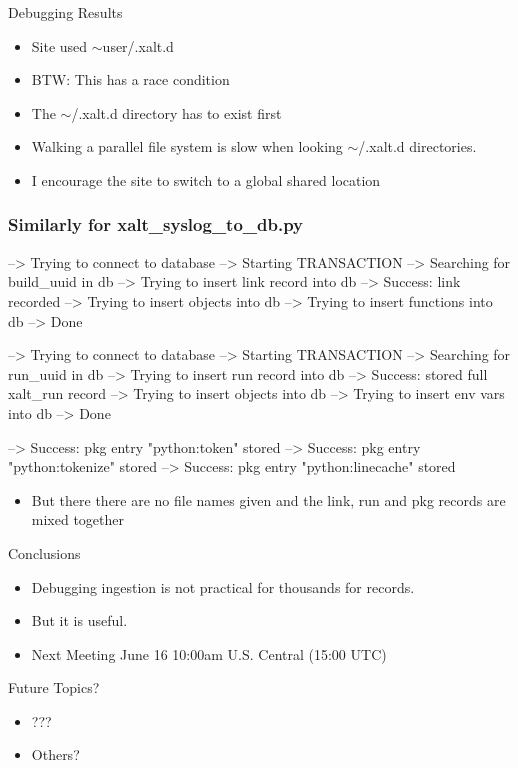 \documentclass{beamer}
\begin{document}
\begin{frame}{Debugging Results}
  \begin{itemize}
    \item Site used $\sim$user/.xalt.d
    \item BTW: This has a race condition 
    \item The $\sim$/.xalt.d directory has to exist first
    \item Walking a parallel file system is slow when looking
      $\sim$/.xalt.d directories.
    \item I encourage the site to switch to a global shared location
  \end{itemize}
\end{frame}

\begin{frame}[fragile]
    \frametitle{Similarly for xalt\_syslog\_to\_db.py}
 {\tiny
    \begin{semiverbatim}
  --> Trying to connect to database
  --> Starting TRANSACTION
  --> Searching for build_uuid in db
  --> Trying to insert link record into db
  --> Success: link recorded
  --> Trying to insert objects into db
  --> Trying to insert functions into db
  --> Done

  --> Trying to connect to database
  --> Starting TRANSACTION
  --> Searching for run_uuid in db
  --> Trying to insert run record into db
  --> Success: stored full xalt_run record
  --> Trying to insert objects into db
  --> Trying to insert env vars into db
  --> Done

  --> Success: pkg entry "python:token" stored
  --> Success: pkg entry "python:tokenize" stored
  --> Success: pkg entry "python:linecache" stored
    \end{semiverbatim}
}
  \begin{itemize}
    \item  But there there are no file names given and the link, run and pkg
  records are mixed together
  \end{itemize}

\end{frame}


\begin{frame}{Conclusions}
  \begin{itemize}
    \item Debugging ingestion is not practical for thousands for
      records.
    \item But it is useful.
    \item Next Meeting June 16 10:00am U.S. Central (15:00 UTC)
  \end{itemize}
\end{frame}


\begin{frame}{Future Topics?}
  \begin{itemize}
    \item ???
    \item Others?
  \end{itemize}
\end{frame}
%

%
\end{document}
